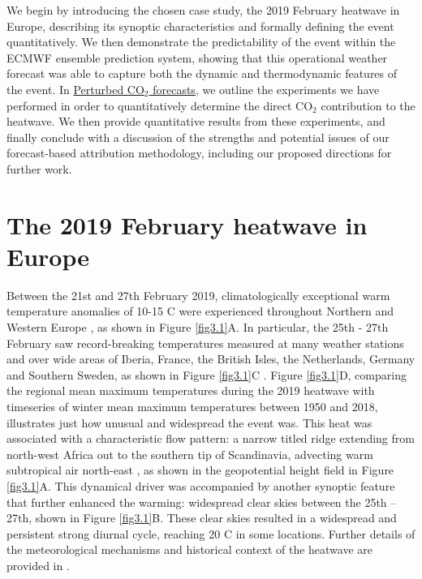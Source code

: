   We begin by introducing the chosen case study, the 2019 February heatwave in Europe, describing its synoptic characteristics and formally defining the event quantitatively. We then demonstrate the predictability of the event within the ECMWF ensemble prediction system, showing that this operational weather forecast was able to capture both the dynamic and thermodynamic features of the event. In \hyperref[ch3:experiments]{Perturbed CO$_2$ forecasts}, we outline the experiments we have performed in order to quantitatively determine the direct CO$_2$ contribution to the heatwave. We then provide quantitative results from these experiments, and finally conclude with a discussion of the strengths and potential issues of our forecast-based attribution methodology, including our proposed directions for further work.

\section{The 2019 February heatwave in Europe}\label{ch3:heatwave}

  Between the 21st and 27th February 2019, climatologically exceptional warm temperature anomalies of 10-15 \degree C were experienced throughout Northern and Western Europe \citep{young_record-breaking_2020}, as shown in Figure \ref{fig3.1}A. In particular, the 25th - 27th February saw record-breaking temperatures measured at many weather stations and over wide areas of Iberia, France, the British Isles, the Netherlands, Germany and Southern Sweden, as shown in Figure \ref{fig3.1}C \citep{cornes_ensemble_2018}. Figure \ref{fig3.1}D, comparing the regional mean maximum temperatures during the 2019 heatwave with timeseries of winter mean maximum temperatures between 1950 and 2018, illustrates just how unusual and widespread the event was. This heat was associated with a characteristic flow pattern: a narrow titled ridge extending from north-west Africa out to the southern tip of Scandinavia, advecting warm subtropical air north-east \citep{sousa_european_2018}, as shown in the geopotential height field in Figure \ref{fig3.1}A. This dynamical driver was accompanied by another synoptic feature that further enhanced the warming: widespread clear skies between the 25th -- 27th, shown in Figure \ref{fig3.1}B. These clear skies resulted in a widespread and persistent strong diurnal cycle, reaching 20 \degree C in some locations. Further details of the meteorological mechanisms and historical context of the heatwave are provided in \citet{young_record-breaking_2020,kendon_temperature_2020,christidis_extremely_2021}.
  
